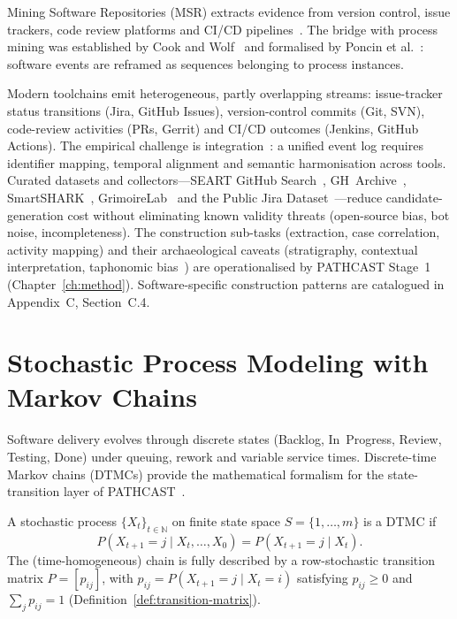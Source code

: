 Mining Software Repositories (MSR) extracts evidence from version control,
issue trackers, code review platforms and CI/CD pipelines~\cite{hassan2008road,
kagdi2007}. The bridge with process mining was established by Cook and
Wolf~\cite{cook1998} and formalised by Poncin et al.~\cite{poncin2011process}:
software events are reframed as sequences belonging to process instances.

Modern toolchains emit heterogeneous, partly overlapping streams:
issue-tracker status transitions (Jira, GitHub Issues), version-control
commits (Git, SVN), code-review activities (PRs, Gerrit) and CI/CD
outcomes (Jenkins, GitHub Actions). The empirical challenge is
integration~\cite{kochhar2019moving, Dixit2021}: a unified event log
requires identifier mapping, temporal alignment and semantic
harmonisation across tools. Curated datasets and collectors---SEART GitHub
Search~\cite{seart2021}, GH~Archive~\cite{gharchive2023},
SmartSHARK~\cite{trautsch2020smartshark},
GrimoireLab~\cite{dueenas2021grimoirelab} and the Public Jira
Dataset~\cite{montgomery2022jira}---reduce candidate-generation cost
without eliminating known validity threats (open-source bias, bot noise,
incompleteness). The construction sub-tasks (extraction, case
correlation, activity mapping) and their archaeological caveats
(stratigraphy, contextual interpretation, taphonomic
bias~\cite{Zimmermann2005MiningVersionHistories}) are operationalised by
PATHCAST Stage~1 (Chapter~\ref{ch:method}). Software-specific construction
patterns are catalogued in Appendix~C, Section~C.4.


\section{Stochastic Process Modeling with Markov Chains}
\label{sec:markov}

Software delivery evolves through discrete states (Backlog, In~Progress,
Review, Testing, Done) under queuing, rework and variable service times.
Discrete-time Markov chains (DTMCs) provide the mathematical formalism for
the state-transition layer of PATHCAST~\cite{Spedicato2017, Haggstrom2002}.

\begin{definition}
\label{def:dtmc}
A stochastic process $\{X_t\}_{t \in \mathbb{N}}$ on finite state space
$S = \{1, \ldots, m\}$ is a DTMC if
\begin{equation}
\label{eq:markov-property}
P(X_{t+1} = j \mid X_t, \ldots, X_0) = P(X_{t+1} = j \mid X_t).
\end{equation}
The (time-homogeneous) chain is fully described by a row-stochastic
transition matrix $P = [p_{ij}]$, with $p_{ij} = P(X_{t+1}=j \mid X_t=i)$
satisfying $p_{ij} \geq 0$ and $\sum_j p_{ij} = 1$
(Definition~\ref{def:transition-matrix}).
\end{definition}

